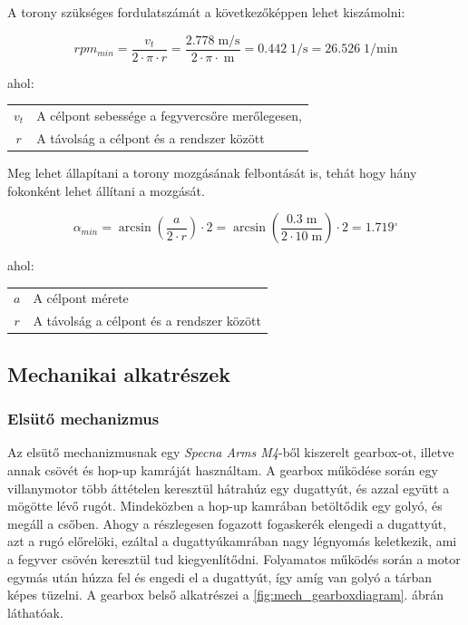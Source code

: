 \documentclass[12pt,a4paper]{article}
\newcommand{\w}[1]{\; \mathrm{#1}}
\begin{document}
A torony szükséges fordulatszámát a következőképpen lehet kiszámolni:


\begin{equation}
	rpm_{min} = \frac{v_t}{2 \cdot \pi \cdot r} = \frac{2.778 \w{m/s}}{2 \cdot \pi \cdot \w{m}} = 0.442 \w{1/s} = 26.526 \w{1/min}
\end{equation}

ahol:

\begin{tabular}{cl}
	$v_t$ & A célpont sebessége a fegyvercsőre merőlegesen, \\
	$r$ & A távolság a célpont és a rendszer között\\
\end{tabular}

Meg lehet állapítani a torony mozgásának felbontását is, tehát hogy hány fokonként lehet állítani a mozgását.

\begin{equation}
	\alpha_{min} = \arcsin\left(\frac{a}{2 \cdot r}\right) \cdot 2 = \arcsin\left(\frac{0.3 \w{m}}{2 \cdot 10 \w{m}}\right) \cdot 2 = 1.719 {^\circ}
\end{equation}

ahol:

\begin{tabular}{cl}
	$a$ & A célpont mérete  \\
	$r$ & A távolság a célpont és a rendszer között\\
\end{tabular}
\pagebreak
\subsection{Mechanikai alkatrészek}
\subsubsection*{Elsütő mechanizmus}
Az elsütő mechanizmusnak egy \textsl{Specna Arms M4}-ből kiszerelt gearbox-ot, illetve annak csövét és hop-up kamráját használtam. A gearbox működése során egy villanymotor több áttételen keresztül hátrahúz egy dugattyút, és azzal együtt a mögötte lévő rugót. Mindeközben a hop-up kamrában betöltődik egy golyó, és megáll a csőben. Ahogy a részlegesen fogazott fogaskerék elengedi a dugattyút, azt a rugó előrelöki, ezáltal a dugattyúkamrában nagy légnyomás keletkezik, ami a fegyver csövén keresztül tud kiegyenlítődni. Folyamatos működés során a motor egymás után húzza fel és engedi el a dugattyút, így amíg van golyó a tárban képes tüzelni. A gearbox belső alkatrészei a \ref{fig:mech_gearboxdiagram}. ábrán láthatóak. 
\end{document}
